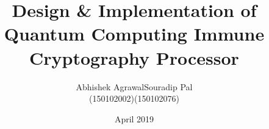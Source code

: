 

\clearpage{}  %


\title{Design \& Implementation of Quantum Computing Immune Cryptography Processor}
\author{\hspace{-10mm}Abhishek Agrawal\hspace{8mm}Souradip Pal\\\hspace{-6mm}(150102002)\hspace{19mm}(150102076)}


\date{April 2019}



\thesis



\maketitle

